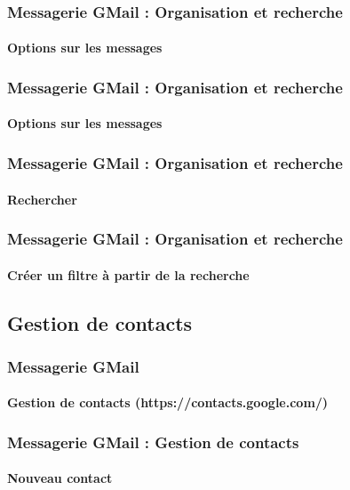 \documentclass[xcolor=table]{beamer}
\begin{document}
\begin{frame}
\frametitle{Messagerie GMail : Organisation et recherche}
\framesubtitle{Options sur les messages}

\begin{center}
\end{center}

\end{frame}

\begin{frame}
\frametitle{Messagerie GMail : Organisation et recherche}
\framesubtitle{Options sur les messages}


\end{frame}

\begin{frame}
\frametitle{Messagerie GMail : Organisation et recherche}
\framesubtitle{Rechercher}
\begin{center}
\end{center}
\end{frame}

\begin{frame}
\frametitle{Messagerie GMail : Organisation et recherche}
\framesubtitle{Créer un filtre à partir de la recherche}
\begin{center}
\end{center}
\end{frame}

\subsection{Gestion de contacts}

\begin{frame}
\frametitle{Messagerie GMail}
\framesubtitle{Gestion de contacts (https://contacts.google.com/)}

\begin{center}
\end{center}

\end{frame}


\begin{frame}
\frametitle{Messagerie GMail : Gestion de contacts}
\framesubtitle{Nouveau contact}

\begin{center}
\end{center}

\end{frame}
\end{document}
